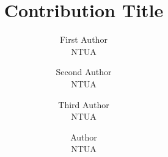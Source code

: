 \documentclass{article}
\begin{document}
\title{Contribution Title}

\author{
  First Author \\ NTUA
  \and
  Second Author \\ NTUA
  \and
  Third Author \\ NTUA
  \and
  Author \\ NTUA
}


\maketitle

\begin{abstract}
  
\end{abstract}

\setcounter{page}{0}
\thispagestyle{empty}
\newpage



% 

% 



%



%



\end{document}
